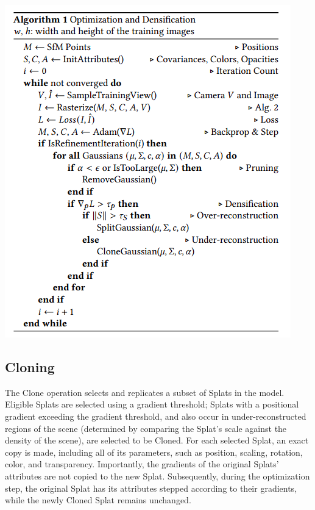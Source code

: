 \documentclass[11pt]{report}
\begin{document}
\begin{center}
\begin{minipage}{0.6\linewidth}
\includegraphics[width = \linewidth]{assets/original_optimization_and_densification}
\end{minipage}
\end{center}

\subsection{Cloning}
The Clone operation selects and replicates a subset of Splats in the model. Eligible Splats are selected using a gradient threshold; Splats with a positional gradient exceeding the gradient threshold, and also occur in under-reconstructed regions of the scene (determined by comparing the Splat's scale against the density of the scene), are selected to be Cloned. For each selected Splat, an exact copy is made, including all of its parameters, such as position, scaling, rotation, color, and transparency. Importantly, the gradients of the original Splats' attributes are not copied to the new Splat. Subsequently, during the optimization step, the original Splat has its attributes stepped according to their gradients, while the newly Cloned Splat remains unchanged.
\end{document}
